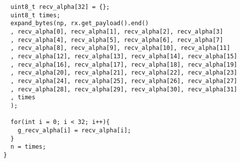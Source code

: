 \documentclass{thesis}
\begin{document}
\begin{lstlisting}
  uint8_t recv_alpha[32] = {};
  uint8_t times;
  expand_bytes(np, rx.get_payload().end()
  , recv_alpha[0], recv_alpha[1], recv_alpha[2], recv_alpha[3]
  , recv_alpha[4], recv_alpha[5], recv_alpha[6], recv_alpha[7]
  , recv_alpha[8], recv_alpha[9], recv_alpha[10], recv_alpha[11]
  , recv_alpha[12], recv_alpha[13], recv_alpha[14], recv_alpha[15]
  , recv_alpha[16], recv_alpha[17], recv_alpha[18], recv_alpha[19]
  , recv_alpha[20], recv_alpha[21], recv_alpha[22], recv_alpha[23]
  , recv_alpha[24], recv_alpha[25], recv_alpha[26], recv_alpha[27]
  , recv_alpha[28], recv_alpha[29], recv_alpha[30], recv_alpha[31]
  , times
  );

  for(int i = 0; i < 32; i++){
    g_recv_alpha[i] = recv_alpha[i];
  }
  n = times;
}
\end{lstlisting}
\end{document}
